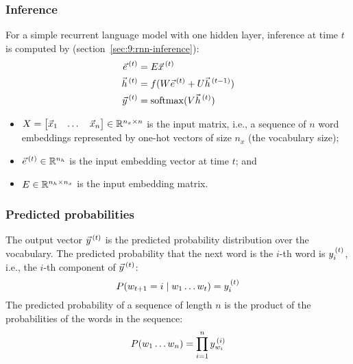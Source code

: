 \subsubsection{Inference}
\label{sec:9:rnn-lm-inference}

For a simple recurrent language model with one hidden layer, inference at time
$t$ is computed by (section~\ref{sec:9:rnn-inference}):
\begin{align}
  \vec{e}^{\,(t)} & = E \vec{x}^{\,(t)}
  \\
  \vec{h}^{\,(t)} & = f(W \vec{e}^{\,(t)} + U \vec{h}^{\,(t - 1)})
  \\
  \vec{y}^{\,(t)} & = \operatorname{softmax}(V \vec{h}^{\,(t)})
\end{align}
\begin{itemize}
  \item $X =
          \begin{bmatrix}
            \vec{x}_1 & \dots & \vec{x}_n
          \end{bmatrix}
          \in \mathbb{R}^{n_x \times n}$ is the input matrix, i.e., a sequence
        of $n$ word embeddings represented by one-hot vectors of size $n_x$ (the
        vocabulary size);
  \item $\vec{e}^{\,(t)} \in \mathbb{R}^{n_h}$ is the input embedding vector at time $t$; and
  \item $E \in \mathbb{R}^{n_h \times n_x}$ is the input embedding matrix.
\end{itemize}

\subsubsection{Predicted probabilities}

The output vector $\vec{y}^{\,(t)}$ is the predicted probability
distribution over the vocabulary.
The predicted probability that the next word is the $i$-th word is
$y_i^{\,(t)}$, i.e., the $i$-th component of $\vec{y}^{\,(t)}$:
\begin{equation}
  P(w_{t + 1} = i \mid w_{1} \dots w_t) = y_i^{\,(t)}
\end{equation}
The predicted probability of a sequence of length $n$ is the product of the
probabilities of the words in the sequence:
\begin{equation}
  P(w_{1} \dots w_{n}) = \prod_{i = 1}^n y_{w_i}^{\,(i)}
\end{equation}

